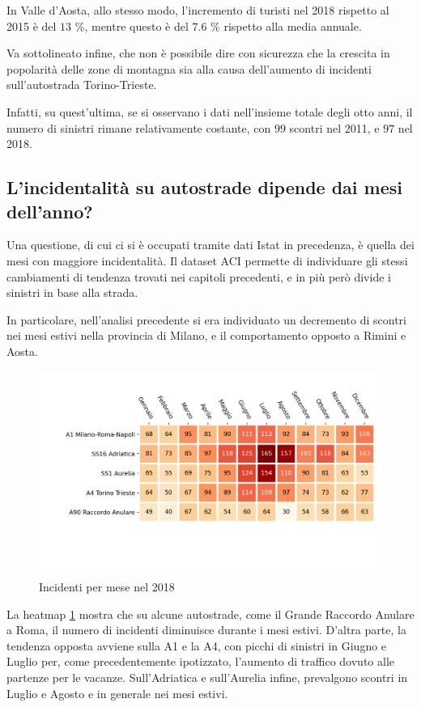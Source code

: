 \documentclass[a4paper,12pt]{report}
\begin{document}
In Valle d'Aosta, allo stesso modo, l'incremento di turisti nel 2018 
rispetto al 2015 è del $13$ \%, mentre questo è del $7.6$ \% rispetto alla media annuale. 

Va sottolineato infine, che non è possibile dire con sicurezza che 
la crescita in popolarità delle zone di montagna sia alla causa dell'aumento 
di incidenti sull'autostrada Torino-Trieste. 

Infatti, su quest'ultima, se si osservano i dati nell'insieme totale degli otto anni, 
il numero di sinistri rimane relativamente costante, 
con $99$ scontri nel 2011, e $97$ nel 2018. 

\subsection{L'incidentalità su autostrade dipende dai mesi dell'anno?}

Una questione, di cui ci si è occupati tramite dati Istat in precedenza, è 
quella dei mesi con maggiore incidentalità. 
Il dataset ACI permette di individuare gli stessi cambiamenti di tendenza trovati nei 
capitoli precedenti, e in più però divide i sinistri in base alla strada. 

In particolare, nell'analisi precedente si era individuato un decremento di scontri 
nei mesi estivi nella provincia di Milano, e il comportamento opposto a 
Rimini e Aosta. 

\begin{figure}
    \includegraphics[width=\linewidth]{../src/incidenti/incidenti_aci/autostrade/mesi_autostrade.png}
    \caption{Incidenti per mese nel 2018}
    \label{fig:incidenti-per-mese}
\end{figure}

La heatmap \ref{fig:incidenti-per-mese} mostra che su alcune autostrade, come il 
Grande Raccordo Anulare a Roma, il numero di incidenti diminuisce durante i mesi 
estivi. 
D'altra parte, la tendenza opposta avviene sulla A1 e la A4, 
con picchi di sinistri in Giugno e Luglio per, come precedentemente ipotizzato, 
l'aumento di traffico dovuto alle partenze per le vacanze. 
Sull'Adriatica e sull'Aurelia infine, prevalgono scontri 
in Luglio e Agosto e in generale nei mesi estivi. 
\end{document}
